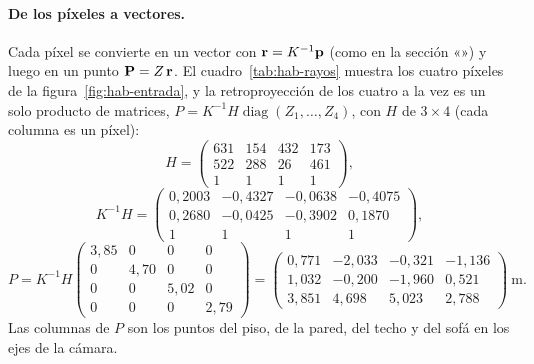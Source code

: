 \paragraph{De los píxeles a vectores.} Cada píxel se convierte en un vector con $\mathbf{r}=K^{-1}\mathbf{p}$ (como en la
sección «») y luego en un punto $\mathbf{P}=Z\,\mathbf{r}$. El cuadro~\ref{tab:hab-rayos} muestra los cuatro píxeles de la figura~\ref{fig:hab-entrada},
y la retroproyección de los cuatro a la vez es un solo producto de matrices, $P=K^{-1}H\operatorname{diag}(Z_1,\dots,Z_4)$, con $H$ de $3\times4$ (cada
columna es un píxel):
\begin{equation}
H=\begin{pmatrix} 631 & 154 & 432 & 173 \\ 522 & 288 & 26 & 461 \\ 1 & 1 & 1 & 1 \end{pmatrix},
\end{equation}
\begin{equation}
K^{-1}H=\begin{pmatrix} 0{,}2003 & -0{,}4327 & -0{,}0638 & -0{,}4075 \\ 0{,}2680 & -0{,}0425 & -0{,}3902 & 0{,}1870 \\ 1 & 1 & 1 & 1 \end{pmatrix},
\end{equation}
\begin{equation}
P=K^{-1}H\begin{pmatrix}3{,}85&0&0&0\\0&4{,}70&0&0\\0&0&5{,}02&0\\0&0&0&2{,}79\end{pmatrix}=\begin{pmatrix} 0{,}771 & -2{,}033 & -0{,}321 & -1{,}136 \\ 1{,}032 & -0{,}200 & -1{,}960 & 0{,}521 \\ 3{,}851 & 4{,}698 & 5{,}023 & 2{,}788 \end{pmatrix}\ \text{m} .
\end{equation}
Las columnas de $P$ son los puntos del piso, de la pared, del techo y del sofá en los ejes de la cámara.

